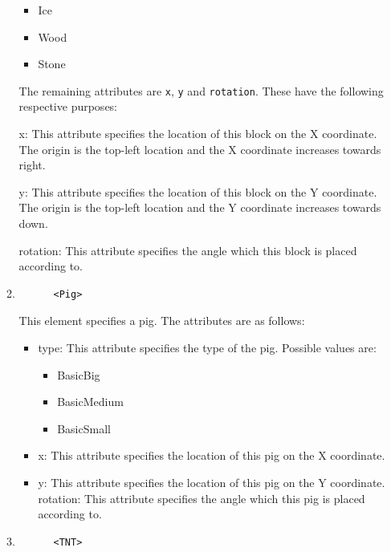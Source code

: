 \documentclass{dalthesis}
\begin{document}
\begin{enumerate}
\begin{enumerate}
    \begin{itemize}
      \item Ice
      \item Wood
      \item Stone
    \end{itemize}

    The remaining attributes are \lstinline{x}, \lstinline{y} and \lstinline{rotation}. These have the following respective purposes:

    x: This attribute specifies the location of this block on the X coordinate. The origin is the top-left location and the X coordinate increases towards right.

    y: This attribute specifies the location of this block on the Y coordinate. The origin is the top-left location and the Y coordinate increases towards down.

    rotation: This attribute specifies the angle which this block is placed according to.

    \item

    \begin{lstlisting}
      <Pig>
    \end{lstlisting}

    This element specifies a pig. The attributes are as follows:

    \begin{itemize}
      \item type: This attribute specifies the type of the pig. Possible values are:

      \begin{itemize}
        \item BasicBig
        \item BasicMedium
        \item BasicSmall
      \end{itemize}

      \item x: This attribute specifies the location of this pig on the X coordinate.
      \item y: This attribute specifies the location of this pig on the Y coordinate.
      rotation: This attribute specifies the angle which this pig is placed according to.
    \end{itemize}

    \item

    \begin{lstlisting}
      <TNT>
    \end{lstlisting}


\end{enumerate}
\end{enumerate}
\end{document}
